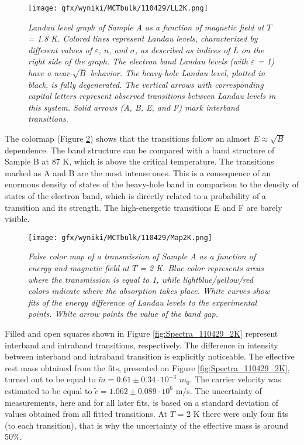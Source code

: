 \documentclass[titlepage,a4paper]{book}
\begin{document}
\begin{figure}[ht]
	\centering
	\texttt{[image: gfx/wyniki/MCTbulk/110429/LL2K.png]}
	\vspace{-10pt}
	\caption{\textit{Landau level graph of Sample A as a function of magnetic field at $T$ = 1.8 K. Colored lines represent Landau levels, characterized by different values of $\varepsilon$, $n$, and $\sigma$, as described as indices of $L$ on the right side of the graph. The electron band Landau levels (with $\varepsilon$ = 1) have a near-$\sqrt{B}$ behavior. The heavy-hole Landau level, plotted in black, is fully degenerated. The vertical arrows with corresponding capital letters represent observed transitions between Landau levels in this system. Solid arrows (A, B, E, and F) mark interband transitions.}}
	\label{fig:LL_110429_2K}
\end{figure}
The colormap (Figure \ref{fig:Map_110429_2K}) shows that the transitions follow an almost $E \approx \sqrt{B}$ dependence. The band structure can be compared with a band structure of Sample B at 87 K, which is above the critical temperature. The transitions marked as A and B are the most intense ones. This is a consequence of an enormous density of states of the heavy-hole band in comparison to the density of states of the electron band, which is directly related to a probability of a transition and its strength. The high-energetic transitions E and F are barely visible.

\begin{figure}[ht]
	\centering
	\texttt{[image: gfx/wyniki/MCTbulk/110429/Map2K.png]}
	\vspace{-10pt}
	\caption{\textit{False color map of a transmission of Sample A as a function of energy and magnetic field at $T$ = 2 K. Blue color represents areas where the transmission is equal to 1, while lightblue/yellow/red colors indicate where the absorption takes place. White curves show fits of the energy difference of Landau levels to the experimental points. White arrow points the value of the band gap.}}
	\label{fig:Map_110429_2K}
\end{figure} 

Filled and open squares shown in Figure \ref{fig:Spectra_110429_2K} represent interband and intraband transitions, respectively. The difference in intensity between interband and intraband transition is explicitly noticeable. The effective rest mass obtained from the fits, presented on Figure \ref{fig:Spectra_110429_2K}, turned out to be equal to $\tilde m = 0.61 \pm 0.34 \cdot 10^{-3}$ $m_0$. The carrier velocity was estimated to be equal to $\tilde{c} = 1.062 \pm 0.089 \cdot 10^6$ m/s. The uncertainty of measurements, here and for all later fits, is based on a standard deviation of values obtained from all fitted transitions. At $T$ = 2 K there were only four fits (to each transition), that is why the uncertainty of the effective mass is around 50\%.
\end{document}
